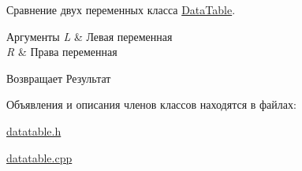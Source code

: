 Сравнение двух переменных класса \mbox{\hyperlink{class_data_table}{Data\+Table}}. 


\begin{DoxyParams}{Аргументы}
{\em L} & Левая переменная \\
\hline
{\em R} & Права переменная \\
\hline
\end{DoxyParams}
\begin{DoxyReturn}{Возвращает}
Результат 
\end{DoxyReturn}


Объявления и описания членов классов находятся в файлах\+:\begin{DoxyCompactItemize}
\item 
\mbox{\hyperlink{datatable_8h}{datatable.\+h}}\item 
\mbox{\hyperlink{datatable_8cpp}{datatable.\+cpp}}\end{DoxyCompactItemize}
